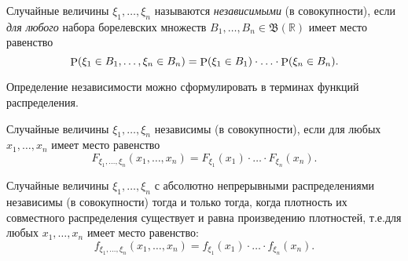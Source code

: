 \begin{to_def}
    Случайные величины $\xi_1, \ldots, \xi_n$ называются \textit{независимыми} (в совокупности), если \textit{для любого} набора борелевских множеств $B_1, \ldots, B_n \in \mathfrak B (\mathbb{R})$ имеет место равенство
    \begin{equation*}
         \P (\xi_1 \in B_1, \ldots, \xi_n \in B_n) 
         =
          \P (\xi_1 \in B_1) \cdot \ldots \cdot \P (\xi_n \in B_n).
     \end{equation*}  
\end{to_def}

Определение независимости можно сформулировать в терминах функций распределения. 

\begin{to_def}
    Случайные величины $\xi_1, \ldots, \xi_n$ независимы (в совокупности), если для любых $x_1,\ldots, x_n$ имеет место равенство
    \begin{equation*}
        F_{\xi_1, \ldots, \xi_n}  (x_1, \ldots, x_n) = F_{\xi_1} (x_1) \cdot \ldots \cdot F_{\xi_n} (x_n).
    \end{equation*}
\end{to_def}

\begin{to_thr}[]
    Случайные величины $\xi_1, \ldots, \xi_n$ с абсолютно непрерывными распределениями независимы (в совокупности) тогда и только тогда, когда плотность их совместного распределения существует и равна произведению плотностей, т.е.для любых $x_1, \ldots, x_n$ имеет место равенство:
    \begin{equation*}
        f_{\xi_1, \ldots, \xi_n} (x_1, \ldots, x_n) = f_{\xi_1} (x_1) \cdot \ldots \cdot f_{\xi_n} (x_n).
    \end{equation*}
\end{to_thr}